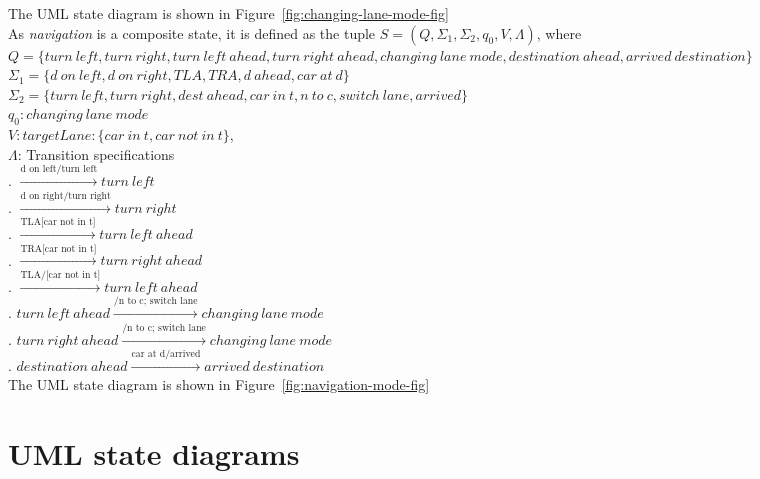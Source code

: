 \documentclass[12pt]{article}
\begin{document}
\begin{spacing}{1.5}
\noindent The UML state diagram is shown in Figure~\ref{fig:changing-lane-mode-fig}\\

\noindent As \textit{navigation} is a composite state, it is defined as the tuple $S = (Q, \Sigma_1, \Sigma_2, q_0, V, \Lambda)$, where\\

\noindent $Q = \{turn~left,turn~right, turn~left~ahead, turn~right~ahead, changing~lane~mode,destination~ahead, arrived~destination\}$\\
\noindent $\Sigma_1 = \{d~on~left, d~on~right, TLA, TRA, d~ahead, car~at~d\}$\\
\noindent $\Sigma_2 = \{turn~left, turn~right, dest~ahead, car~in~t, n~to~c, switch~lane, arrived\}$\\
\noindent $q_0: changing~lane~mode$\\
\noindent $V: targetLane: \{car~in~t, car~not~in~t\}$,\\
\noindent $\Lambda$: Transition specifications\\
. $\xrightarrow {\text{d on left/turn left}} turn~left$\\
. $\xrightarrow {\text{d on right/turn right}} turn~right$\\
. $\xrightarrow {\text{TLA[car not in t]}} turn~left~ahead$\\
. $\xrightarrow {\text{TRA[car not in t]}} turn~right~ahead$\\
. $\xrightarrow {\text{TLA/[car not in t]}} turn~left~ahead$\\
. $turn~left~ahead\xrightarrow {\text{/n to c; switch lane}} changing~lane~mode$\\
. $turn~right~ahead\xrightarrow {\text{/n to c; switch lane}} changing~lane~mode$\\
. $destination~ahead\xrightarrow {\text{car at d/arrived}} arrived~destination$\\

\noindent The UML state diagram is shown in Figure~\ref{fig:navigation-mode-fig}\\

\newpage

\section{UML state diagrams}


\end{spacing}
\end{document}
